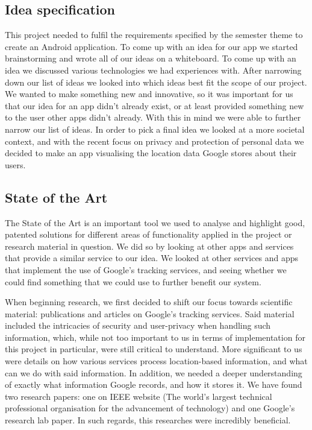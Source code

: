 \documentclass[12p]{article}
\begin{document}
    \subsection{Idea specification}
	
	This project needed to fulfil the requirements specified by the semester theme to create an Android application. To come up with an idea for our app we started brainstorming and wrote all of our ideas on a whiteboard. To come up with an idea we discussed various technologies we had experiences with. After narrowing down our list of ideas we looked into which ideas best fit the scope of our project. We wanted to make something new and innovative, so it was important for us that our idea for an app didn't already exist, or at least provided something new to the user other apps didn't already. With this in mind we were able to further narrow our list of ideas. In order to pick a final idea we looked at a more societal context, and with the recent focus on privacy and protection of personal data we decided to make an app visualising the location data Google stores about their users.
	
	\subsection{State of the Art}
	
    The State of the Art is an important tool we used to analyse and highlight good, patented solutions for different areas of functionality applied in the project or research material in question. We did so by looking at other apps and services that provide a similar service to our idea. We looked at other services and apps that implement the use of Google's tracking services, and seeing whether we could find something that we could use to further benefit our system.
	
	When beginning research, we first decided to shift our focus towards scientific material: publications and articles on Google's tracking services. Said material included the intricacies of security and user-privacy when handling such information, which, while not too important to us in terms of implementation for this project in particular, were still critical to understand. More significant to us were details on how various services process location-based information, and what can we do with said information. In addition, we needed a deeper understanding of exactly what information Google records, and how it stores it. We have found two research papers: one on IEEE website (The world's largest technical professional organisation for the advancement of technology) and one Google's research lab paper. In such regards, this researches were incredibly beneficial.
	
\end{document}
